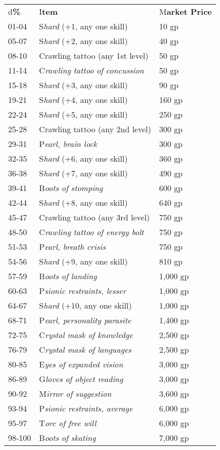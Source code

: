 \documentclass{article}
\begin{document}
\vspace{12pt}
\begin{tabular}{|>{\raggedright}p{28pt}|>{\raggedright}p{124pt}|>{\raggedright}p{55pt}|}
\hline
\multicolumn{3}{|p{208pt}|}{T\textbf{able: Minor Universal Items}}\tabularnewline
\hline
d\textbf{\%} & I\textbf{tem} & M\textbf{arket Price}\tabularnewline
\hline
01-04 & S\textit{hard }(+1, any one skill) & 10 gp\tabularnewline
\hline
05-07 & S\textit{hard }(+2, any one skill) & 40 gp\tabularnewline
\hline
08-10 & Crawling tattoo (any 1st level) & 50 gp\tabularnewline
\hline
11-14 & C\textit{rawling tattoo of concussion} & 50 gp\tabularnewline
\hline
15-18 & S\textit{hard }(+3, any one skill) & 90 gp\tabularnewline
\hline
19-21 & S\textit{hard }(+4, any one skill) & 160 gp\tabularnewline
\hline
22-24 & S\textit{hard }(+5, any one skill) & 250 gp\tabularnewline
\hline
25-28 & Crawling tattoo (any 2nd level) & 300 gp\tabularnewline
\hline
29-31 & P\textit{earl, brain lock} & 300 gp\tabularnewline
\hline
32-35 & S\textit{hard }(+6, any one skill) & 360 gp\tabularnewline
\hline
36-38 & S\textit{hard }(+7, any one skill) & 490 gp\tabularnewline
\hline
39-41 & B\textit{oots of stomping} & 600 gp\tabularnewline
\hline
42-44 & S\textit{hard }(+8, any one skill) & 640 gp\tabularnewline
\hline
45-47 & Crawling tattoo (any 3rd level) & 750 gp\tabularnewline
\hline
48-50 & C\textit{rawling tattoo of energy bolt} & 750 gp\tabularnewline
\hline
51-53 & P\textit{earl, breath crisis} & 750 gp\tabularnewline
\hline
54-56 & S\textit{hard }(+9, any one skill) & 810 gp\tabularnewline
\hline
57-59 & B\textit{oots of landing } & 1,000 gp\tabularnewline
\hline
60-63 & P\textit{sionic restraints, lesser} & 1,000 gp\tabularnewline
\hline
64-67 & S\textit{hard }(+10, any one skill) & 1,000 gp\tabularnewline
\hline
68-71 & P\textit{earl, personality parasite} & 1,400 gp\tabularnewline
\hline
72-75 & C\textit{rystal mask of knowledge} & 2,500 gp\tabularnewline
\hline
76-79 & C\textit{rystal mask of languages} & 2,500 gp\tabularnewline
\hline
80-85 & E\textit{yes of expanded vision} & 3,000 gp\tabularnewline
\hline
86-89 & G\textit{loves of object reading} & 3,000 gp\tabularnewline
\hline
90-92 & M\textit{irror of suggestion} & 3,600 gp\tabularnewline
\hline
93-94 & P\textit{sionic restraints, average} & 6,000 gp\tabularnewline
\hline
95-97 & T\textit{orc of free will} & 6,000 gp\tabularnewline
\hline
98-100 & B\textit{oots of skating} & 7,000 gp\tabularnewline
\hline
\end{tabular}
\end{document}
